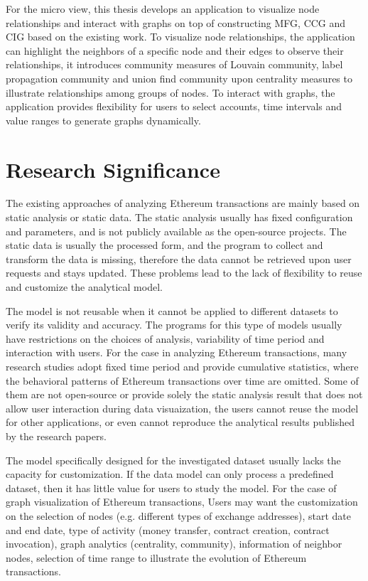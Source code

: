 For the micro view, this thesis develops an application to visualize node relationships and interact with graphs on top of constructing MFG, CCG and CIG based on the existing work. To visualize node relationships, the application can highlight the neighbors of a specific node and their edges to observe their relationships, it introduces community measures of Louvain community, label propagation community and union find community upon centrality measures to illustrate relationships among groups of nodes. To interact with graphs, the application provides flexibility for users to select accounts, time intervals and value ranges to generate graphs dynamically.

\section{Research Significance}
\label{sec:review:significance}


The existing approaches of analyzing Ethereum transactions are mainly based on static analysis or static data. The static analysis usually has fixed configuration and parameters, and is not publicly available as the open-source projects. The static data is usually the processed form, and the program to collect and transform the data is missing, therefore the data cannot be retrieved upon user requests and stays updated. These problems lead to the lack of flexibility to reuse and customize the analytical model. 

The model is not reusable when it cannot be applied to different datasets to verify its validity and accuracy. The programs for this type of models usually have restrictions on the choices of analysis, variability of time period and interaction with users. For the case in analyzing Ethereum transactions, many research studies adopt fixed time period and provide cumulative statistics, where the behavioral patterns of Ethereum transactions over time are omitted. Some of them are not open-source or provide solely the static analysis result that does not allow user interaction during data visuaization, the users cannot reuse the model for other applications, or even cannot reproduce the analytical results published by the research papers.

The model specifically designed for the investigated dataset usually lacks the capacity for customization. If the data model can only process a predefined dataset, then it has little value for users to study the model. For the case of graph visualization of Ethereum transactions, Users may want the customization on the selection of nodes (e.g. different types of exchange addresses), start date and end date, type of activity (money transfer, contract creation, contract invocation), graph analytics (centrality, community), information of neighbor nodes, selection of time range to illustrate the evolution of Ethereum transactions.

